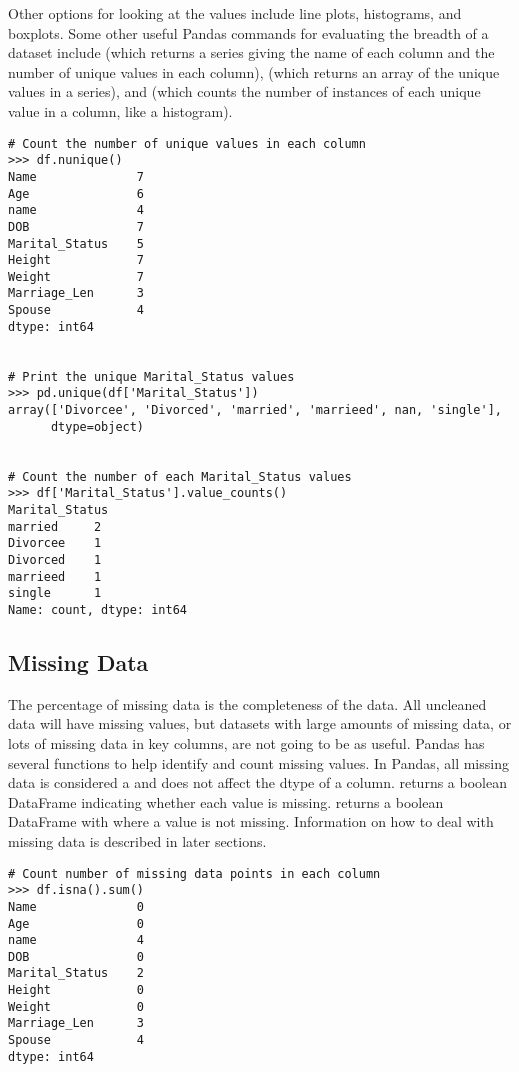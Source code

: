 Other options for looking at the values include line plots, histograms, and boxplots.
Some other useful Pandas commands for evaluating the breadth of a dataset include  (which returns a series giving the name of each column and the number of unique values in each column),  (which returns an array of the unique values in a series), and  (which counts the number of instances of each unique value in a column, like a histogram).

\begin{lstlisting}
# Count the number of unique values in each column
>>> df.nunique()
Name              7
Age               6
name              4
DOB               7
Marital_Status    5
Height            7
Weight            7
Marriage_Len      3
Spouse            4
dtype: int64


# Print the unique Marital_Status values
>>> pd.unique(df['Marital_Status'])
array(['Divorcee', 'Divorced', 'married', 'marrieed', nan, 'single'],
      dtype=object)


# Count the number of each Marital_Status values
>>> df['Marital_Status'].value_counts()
Marital_Status
married     2
Divorcee    1
Divorced    1
marrieed    1
single      1
Name: count, dtype: int64

\end{lstlisting}

\subsection*{Missing Data}
The percentage of missing data is the completeness of the data. 
All uncleaned data will have missing values, but datasets with large amounts of missing data, or lots of missing data in key columns, are not going to be as useful.
Pandas has several functions to help identify and count missing values.
In Pandas, all missing data is considered a  and does not affect the dtype of a column.
 returns a boolean DataFrame indicating whether each value is missing.
 returns a boolean DataFrame with  where a value is not missing.
Information on how to deal with missing data is described in later sections. 

\begin{lstlisting}
# Count number of missing data points in each column
>>> df.isna().sum()
Name              0
Age               0
name              4
DOB               0
Marital_Status    2
Height            0
Weight            0
Marriage_Len      3
Spouse            4
dtype: int64
\end{lstlisting}


